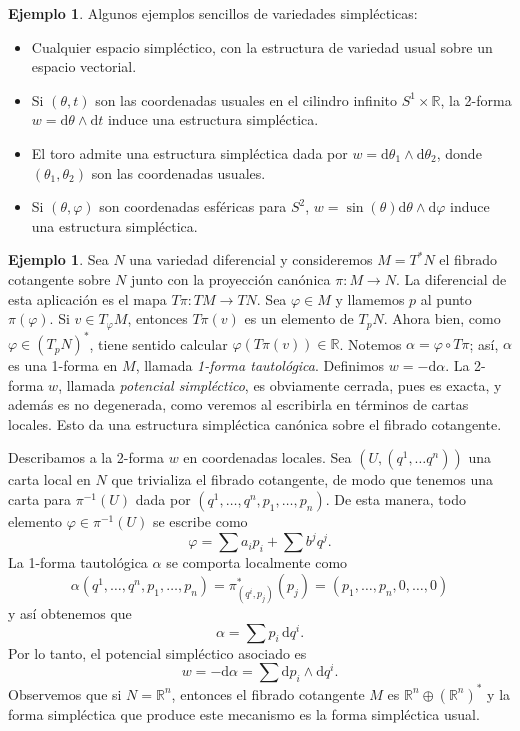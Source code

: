 \documentclass[11pt, a4paper]{article}
\newcommand{\RR}{\mathbb{R}}
\theoremstyle{plain}
\theoremstyle{definition}
\newtheorem{exmp}[prop]{Ejemplo}
\begin{document}
\begin{exmp} Algunos ejemplos sencillos de variedades simplécticas:
\begin{itemize}
\item Cualquier espacio simpléctico, con la estructura de variedad usual sobre un espacio vectorial.
\item Si $(\theta, t)$ son las coordenadas usuales en el cilindro infinito $S^1\times \RR$, la 2-forma $w=\mathrm{d}\theta\wedge\mathrm{d}t$ induce una estructura simpléctica.
\item El toro admite una estructura simpléctica dada por $w=\mathrm{d}\theta_1\wedge\mathrm{d}\theta_2$, donde $(\theta_1,\theta_2)$ son las coordenadas usuales.
\item Si $(\theta,\varphi)$ son coordenadas esféricas para $S^2$, $w=\sin(\theta)\mathrm{d}\theta\wedge\mathrm{d}\varphi$ induce una estructura simpléctica.
\end{itemize}
\end{exmp}
\begin{exmp} Sea $N$ una variedad diferencial y consideremos $M=T^*N$ el fibrado cotangente sobre $N$ junto con la proyección canónica $\pi:M\to N$. La diferencial de esta aplicación es el mapa $T\pi:TM\to TN$. Sea $\varphi\in M$ y llamemos $p$ al punto $\pi(\varphi)$. Si $v\in T_\varphi M$, entonces $T\pi(v)$ es un elemento de $T_pN$. Ahora bien, como $\varphi \in (T_pN)^*$, tiene sentido calcular $\varphi(T\pi(v))\in \RR$. Notemos $\alpha = \varphi\circ T\pi$; así, $\alpha$ es una 1-forma en $M$, llamada \emph{1-forma tautológica}. Definimos $w=-\mathrm{d}\alpha$. La 2-forma $w$, llamada \emph{potencial simpléctico}, es obviamente cerrada, pues es exacta, y además es no degenerada, como veremos al escribirla en términos de cartas locales. Esto da una estructura simpléctica canónica sobre el fibrado cotangente.

Describamos a la 2-forma $w$ en coordenadas locales. Sea $(U, (q^1,\dots q^n))$ una carta local en $N$ que trivializa el fibrado cotangente, de modo que tenemos una carta para $\pi^{-1}(U)$ dada por $(q^1,\dots,q^n,p_1,\dots,p_n)$. De esta manera, todo elemento $\varphi\in\pi^{-1}(U)$ se escribe como
\[\varphi = \sum a_i p_i + \sum b^jq^j.\]
La 1-forma tautológica $\alpha$ se comporta localmente como
\[\alpha(q^1,\dots,q^n,p_1,\dots,p_n)= \pi^*_{(q^i,p_j)}(p_j) =(p_1,\dots,p_n,0,\dots,0)\]
y así obtenemos que
\[\alpha=\sum p_i\,\mathrm{d}q^i.\]
Por lo tanto, el potencial simpléctico asociado es
\[w= -\mathrm{d}\alpha = \sum \mathrm{d}p_i\wedge \mathrm{d}q^i.\]
Observemos que si $N=\RR^n$, entonces el fibrado cotangente $M$ es $\RR^n\oplus (\RR^n)^*$ y la forma simpléctica que produce este mecanismo es la forma simpléctica usual.
\end{exmp}
\end{document}
